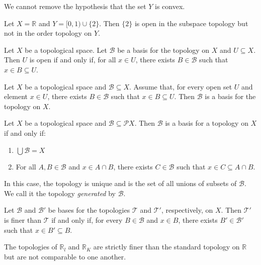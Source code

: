 \begin{ex}
We cannot remove the hypothesis that the set $Y$ is convex.

Let $X = \mathbb{R}$ and $Y = [0,1) \cup \{2\}$. Then $\{2\}$ is open in the subspace topology but not in the order topology on $Y$.
\end{ex}

\begin{prop}
Let $X$ be a topological space. Let $\mathcal{B}$ be a basis for the topology on $X$ and $U \subseteq X$. Then $U$ is open if and only if, for all $x \in U$, there exists $B \in \mathcal{B}$ such that $x \in B \subseteq U$.
\end{prop}

\begin{prop}
Let $X$ be a topological space and $\mathcal{B} \subseteq X$. Assume that, for every open set $U$ and element $x \in U$, there exists $B \in \mathcal{B}$ such that $x \in B \subseteq U$. Then $\mathcal{B}$ is a basis for the topology on $X$.
\end{prop}

\begin{prop}
Let $X$ be a topological space and $\mathcal{B} \subseteq \mathcal{P} X$. Then $\mathcal{B}$ is a basis for a topology on $X$ if and only if:
\begin{enumerate}
\item $\bigcup \mathcal{B} = X$
\item For all $A, B \in \mathcal{B}$ and $x \in A \cap B$, there exists $C \in \mathcal{B}$ such that $x \in C \subseteq A \cap B$.
\end{enumerate}
In this case, the topology is unique and is the set of all unions of subsets of $\mathcal{B}$. We call it the topology \emph{generated} by $\mathcal{B}$.
\end{prop}

\begin{prop}
Let $\mathcal{B}$ and $\mathcal{B}'$ be bases for the topologies $\mathcal{T}$ and $\mathcal{T}'$, respectively, on $X$. Then $\mathcal{T}'$ is finer than $\mathcal{T}$ if and only if, for every $B \in \mathcal{B}$ and $x \in B$, there exists $B' \in \mathcal{B}'$ such that $x \in B' \subseteq B$.
\end{prop}

\begin{cor}
The topologies of $\mathbb{R}_l$ and $\mathbb{R}_K$ are strictly finer than the standard topology on $\mathbb{R}$ but are not comparable to one another.
\end{cor}


